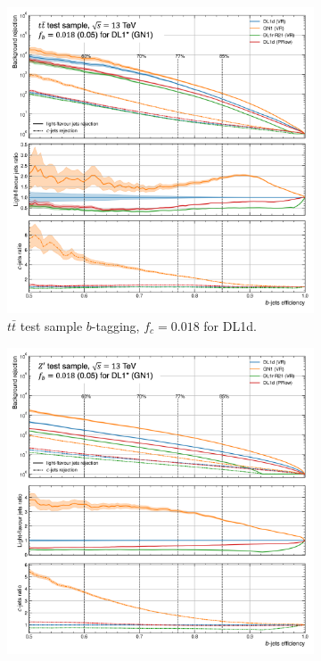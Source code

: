 \begin{figure}
  \vspace{0.6cm}
  \begin{subfigure}[t]{0.3\textwidth}
    \centering
    \includegraphics[scale=0.43]{Images/FTAG/VRDL1d/ROC/ttb.png}
    \caption{$t\bar{t}$ test sample $b$-tagging, $f_c = 0.018$ for DL1d.}
    \label{fig:dl1dVRROCtt}
  \end{subfigure}
  \hfill
  \begin{subfigure}[t]{0.3\textwidth}
    \centering
    \includegraphics[scale=0.43]{Images/FTAG/VRDL1d/ROC/zpb.png}

\end{subfigure}
\end{figure}
